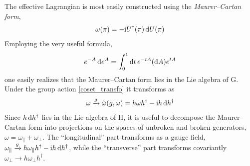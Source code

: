 \documentclass[final,2p,times,12pt,sort&compress]{elsarticle}
\newcommand\gr[1]{\mathrm{#1}}              %
\newcommand\he[1]{#1^{\dagger}}             %
\newcommand\imag{\mathrm i}                 %
\newcommand\dd{\mathop{{\rm d}\!}\nolimits} %
\begin{document}
The effective Lagrangian is most easily constructed using the
\emph{Maurer--Cartan form},
\begin{equation}
\omega(\pi)=-\imag\he U(\pi)\dd U(\pi)
\end{equation}
Employing the very useful formula,
\begin{equation}
e^{-A}\dd e^A=\int_0^1\dd t\,e^{-tA}(\dd A)e^{tA}
\label{Baker_fla}
\end{equation}
one easily realizes that the Maurer--Cartan form lies in the Lie algebra of
$\gr G$. Under the group action \eqref{coset_transfo} it transforms as
\begin{equation}
\omega\xrightarrow{g}\tilde\omega(g,\omega)=h\omega\he h-\imag h\dd\he h
\label{Maurer_transfo}
\end{equation}
Since $h\dd\he h$ lies in the Lie algebra of $\gr H$, it is useful to decompose
the Maurer--Cartan form into projections on the spaces of unbroken and broken
generators, $\omega=\omega_\parallel+\omega_\perp$. The ``longitudinal'' part
transforms as a gauge field,
$\omega_\parallel\xrightarrow{g}h\omega_\parallel\he h-\imag h\dd\he h$, while
the ``transverse'' part transforms covariantly $\omega_\perp\to
h\omega_\perp\he h$.
\end{document}

